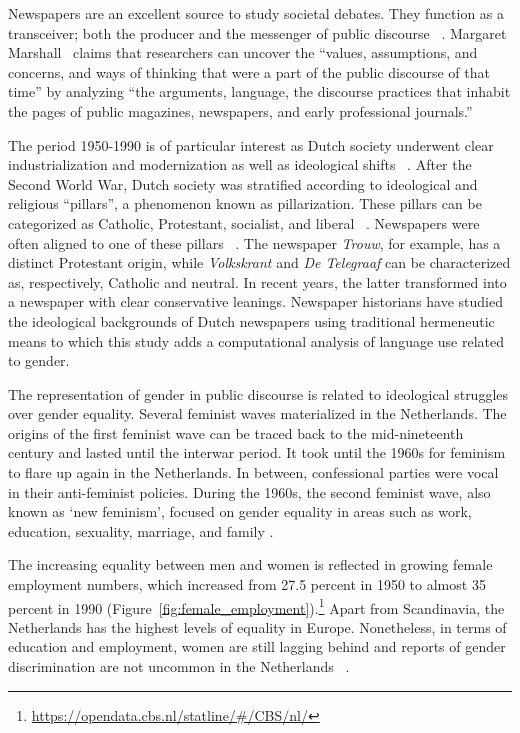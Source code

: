 \documentclass[11pt,a4paper]{article}
\begin{document}
Newspapers are an excellent source to study societal debates. They function as a transceiver; both the producer and the messenger of public discourse ~\cite{schudson_power_1982}. Margaret Marshall~ claims that researchers can uncover the ``values, assumptions, and concerns, and ways of thinking that were a part of the public discourse of that time'' by analyzing ``the arguments, language, the discourse practices that inhabit the pages of public magazines, newspapers, and early professional journals.'' 

The period 1950-1990 is of particular interest as Dutch society underwent clear industrialization and modernization as well as ideological shifts ~\cite{schot_technology_2010}. After the Second World War, Dutch society was stratified according to ideological and religious ``pillars'', a phenomenon known as pillarization. These pillars can be categorized as Catholic, Protestant, socialist, and liberal ~\cite{wintle_economic_2000}. 
Newspapers were often aligned to one of these pillars ~\cite{wijfjes_journalistiek_2004, rooij_kranten:_1974}. The newspaper \textit{Trouw}, for example, has a distinct Protestant origin, while \textit{Volkskrant} and \textit{De Telegraaf} can be characterized as, respectively, Catholic and neutral. In recent years, the latter transformed into a newspaper with clear conservative leanings. Newspaper historians have studied the ideological backgrounds of Dutch newspapers using traditional hermeneutic means to which this study adds a computational analysis of language use related to gender. 

The representation of gender in public discourse is related to ideological struggles over gender equality. Several feminist waves materialized in the Netherlands. The origins of the first feminist wave can be traced back to the mid-nineteenth century and lasted until the interwar period. It took until the 1960s for feminism to flare up again in the Netherlands. In between, confessional parties were vocal in their anti-feminist policies. During the 1960s, the second feminist wave, also known as `new feminism', focused on gender equality in areas such as work, education, sexuality, marriage, and family \cite{ribberink_feminisme_1987}. 

The increasing equality between men and women is reflected in growing female employment numbers, which increased from 27.5 percent in 1950 to almost 35 percent in 1990 (Figure~\ref{fig:female_employment}).\footnote{\url{https://opendata.cbs.nl/statline/\#/CBS/nl/}} Apart from Scandinavia, the Netherlands has the highest levels of equality in Europe. Nonetheless, in terms of education and employment, women are still lagging behind and reports of gender discrimination are not uncommon in the Netherlands ~\cite{baali_overheid_2018, ministerie_van_onderwijs_vrouwenemancipatie_2009}.
\end{document}
